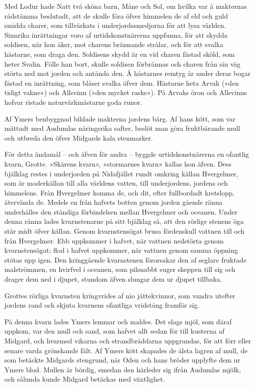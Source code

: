 Med Lodur hade Natt två sköna barn, Måne och Sol, om hvilka var å
makternas rådstämma beslutadt, att de skulle föra öfver himmelen de af
eld och guld smidda charer, som tillvärkats i underjordssmedjorna för
att lysa världen. Sinnrika inrättningar voro af urtidskonstnärerna
uppfunna, för att skydda soldisen, när hon åker, mot charens brännande
strålar, och för att svalka hästarne, som draga den. Soldisens skydd är
en vid charen fästad sköld, som heter Svalin. Fölle han bort, skulle
soldisen förbrännas och charen från sin väg störta ned mot jorden och
antända den. Å hästarnes remtyg är under deras bogar fästad en
inrättning, som blåser svalka öfver dem. Hästarne heta Arvak (»den
tidigt vakne») och Allsvinn (»den mycket raske»). På Arvaks öron och
Allsvinns hofvar ristade naturvärkmästarne goda runor.

Af Ymers benbyggnad bildade makterna jordens bärg. Af hans kött, som var
mättadt med Audumlas näringsrika safter, beslöt man göra fruktbärande
mull och utbreda den öfver Midgards kala stenmarker.



För detta ändamål -- och äfven för andra -- byggde urtidskonstnärerna en
ofantlig kvarn, Grotte. »Skärens kvarn», »stormarnes kvarn» kallas hon
äfven. Dess bjälklag restes i underjorden på Nidafjället rundt omkring
källan Hvergelmer, som är moderkällan till alla världens vatten, till
underjordens, jordens och himmelens. Från Hvergelmer komma de, och dit,
efter fullbordadt kretslopp, återvända de. Medels en från hafvets botten
genom jorden gående ränna underhålles den ständiga förbindelsen mellan
Hvergelmer och oceanen. Under denna ränna lades kvarnstenarne på sitt
bjälklag så, att den rörlige stenens öga står midt öfver källan. Genom
kvarnstensögat brusa fördenskull vattnen till och från Hvergelmer. Ebb
uppkommer i hafvet, när vattnen nedstörta
genom kvarnstensögat; flod i hafvet uppkommer, när vattnen genom samma
öppning stötas upp igen. Den kringgående kvarnstenen förorsakar den af
seglare fruktade malströmmen, en hvirfvel i oceanen, som pilsnabbt suger
skeppen till sig och drager dem ned i djupet, stundom äfven slungar dem
ur djupet tillbaka.

Grottes rörliga kvarnsten kringvrides af nio jättekvinnor, som vandra
utefter jordens rand och skjuta kvarnens ofantliga vridstång framför
sig.

På denna kvarn lades Ymers lemmar och maldes. Det slags mjöl, som däraf
uppkom, var den mull och sand, som hafvet allt sedan för till kusterna
af Midgard, och hvarmed vikarna och strandbräddarna uppgrundas, för att
förr eller senare varda grönskande fält. Af Ymers kött skapades de älsta
lagren af mull, de som betäckte Midgards stengrund, när Oden och hans
bröder upplyfte dem ur Ymers blod. Mullen är bördig, emedan den härleder
sig ifrån Audumlas mjölk, och sålunda kunde Midgard betäckas med
växtlighet.

